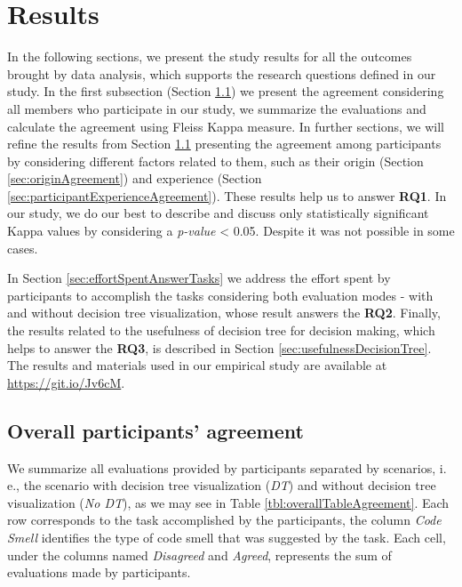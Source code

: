 \chapter{Results}
\label{sec:results}

In the following sections, we present the study results for all the outcomes brought by data analysis, which supports the research questions defined in our study. In the first subsection (Section \ref{sec:overalAgreement}) we present the agreement considering all members who participate in our study, we summarize the evaluations and calculate the agreement using Fleiss Kappa measure. In further sections, we will refine the results from Section \ref{sec:overalAgreement} presenting the agreement among participants by considering different factors related to them, such as their origin (Section \ref{sec:originAgreement}) and experience (Section \ref{sec:participantExperienceAgreement}). These results help us to answer \textbf{RQ1}. In our study, we do our best to describe and discuss only statistically significant Kappa values by considering a \textit{p-value} < 0.05. Despite it was not possible in some cases.

In Section \ref{sec:effortSpentAnswerTasks} we address the effort spent by participants to accomplish the tasks considering both evaluation modes - with and without decision tree visualization, whose result answers the  \textbf{RQ2}. Finally, the results related to the usefulness of decision tree for decision making, which helps to answer the \textbf{RQ3}, is described in Section \ref{sec:usefulnessDecisionTree}. The results and materials used in our empirical study are available at \hyperlink{https://git.io/Jv6cM}{https://git.io/Jv6cM}.

\section{Overall participants' agreement} \label{sec:overalAgreement}

We summarize all evaluations provided by participants separated by scenarios, i. e., the scenario with decision tree visualization (\textit{DT}) and without decision tree visualization (\textit{No DT}), as we may see in Table \ref{tbl:overallTableAgreement}. Each row corresponds to the task accomplished by the participants, the column \textit{Code Smell} identifies the type of code smell that was suggested by the task. Each cell, under the columns named \textit{Disagreed} and \textit{Agreed}, represents the sum of evaluations made by participants.

